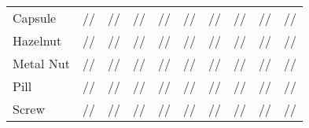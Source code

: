\documentclass[lettersize,journal]{IEEEtran}
\begin{document}
\begin{table*}[htbp]
{\begin{tabular}{lccccccccc}
      Capsule      & //                                       & //                                                                          & //                                                  & //                                                                          & //{\color{blue}{}}                        & /{\color{red}{}}/                    & //                                     & {\color{blue}{}}/{\color{blue}{}}/                          & {\color{red}{}}//{\color{red}{}}                            \\
      Hazelnut     & //                                       & {\color{blue}{}}/{\color{red}{}}/{\color{red}{}} & //                                                  & {\color{red}{}}/{\color{blue}{}}/{\color{red}{}} & //{\color{blue}{}}                        & //                                            & //                                     & //{\color{blue}{}}                                                   & //{\color{blue}{}}                                                   \\
      Metal Nut    & //                                       & {\color{blue}{}}//{\color{red}{}}                         & //                                                  & /{\color{red}{}}/{\color{blue}{}}                         & //                                                 & //                                            & //                                     & {\color{red}{}}/{\color{blue}{}}/{\color{red}{}}   & /{\color{blue}{}}/                                                   \\
      Pill         & //                                       & //                                                                          & //                                                  & //                                                                          & //                                                 & //                                            & //                                     & {\color{blue}{}}/{\color{blue}{}}/{\color{blue}{}} & {\color{red}{}}/{\color{red}{}}/{\color{red}{}}    \\
      Screw        & //{\color{blue}{}}              & //                                                                          & /{\color{blue}{}}/{\color{red}{}} & //                                                                          & //                                                 & //                                            & //                                     & {\color{blue}{}}//{\color{red}{}}                           & {\color{red}{}}/{\color{red}{}}/{\color{red}{}}    \\

\end{tabular}}
\end{table*}
\end{document}
